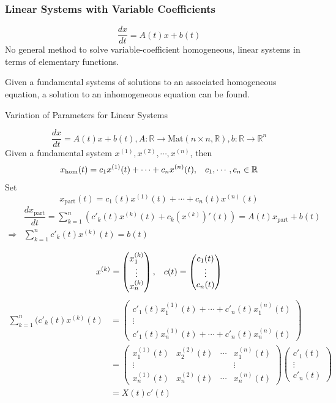 \documentclass{beamer}
\begin{document}
\begin{frame}
\frametitle{Linear Systems with Variable Coefficients}
$$\dfrac{dx}{dt}=A(t)x+b(t)$$
No general method to solve variable-coefficient homogeneous, linear systems in terms of elementary functions.
\begin{block}{}
Given a fundamental systems of solutions to an associated homogeneous equation, a solution to an inhomogeneous equation can be found.
\end{block}
\end{frame}

\begin{frame}
\begin{block}{Variation of Parameters for Linear Systems}

\end{block}
$$\dfrac{dx}{dt}=A(t)x+b(t),A:\mathbb{R}\rightarrow\text{Mat}(n\times n,\mathbb{R}),b:\mathbb{R}\rightarrow\mathbb{R}^n$$
Given a fundamental system $x^{(1)},x^{(2)},\cdots,x^{(n)}$, then
$$x_{\text{hom}}(t)=c_1x^{(1)}(t)+\cdots+c_nx^{(n)}(t),\hspace{3mm}c_1,\cdots,c_n\in\mathbb{R}$$
Set
$$x_{\text{part}}(t)=c_1(t)x^{(1)}(t)+\cdots+c_n(t)x^{(n)}(t)$$
\begin{align*}
&\dfrac{dx_{\text{part}}}{dt}=\sum\limits_{k=1}^n(c'_k(t)x^{(k)}(t)+c_k(x^{(k)})'(t))=A(t)x_{\text{part}}+b(t)\\
\Rightarrow &\sum\limits_{k=1}^nc'_k(t)x^{(k)}(t)=b(t)
\end{align*}
\end{frame}

\begin{frame}
$$x^{(k)}=\begin{pmatrix}
x_1^{(k)}\\
\vdots\\
x_n^{(k)}
\end{pmatrix},\hspace{3mm}c(t)=\begin{pmatrix}
c_1(t)\\
\vdots\\
c_n(t)
\end{pmatrix} $$
\begin{align*}
\sum\limits_{k=1}^n(c'_k(t)x^{(k)}(t)&=\begin{pmatrix}
c'_1(t)x_1^{(1)}(t)+\cdots+c'_n(t)x_1^{(n)}(t)\\
\vdots\\
c'_1(t)x_n^{(1)}(t)+\cdots+c'_n(t)x_n^{(n)}(t)
\end{pmatrix}\\
&=\begin{pmatrix}
x_1^{(1)}(t)&x_2^{(2)}(t)&\cdots&x_1^{(n)}(t)\\
\vdots&&&\vdots\\
x_n^{(1)}(t)&x_n^{(2)}(t)&\cdots&x_n^{(n)}(t)
\end{pmatrix}
\begin{pmatrix}
c'_1(t)\\
\vdots\\
c'_n(t)
\end{pmatrix}\\
&=X(t)c'(t)
\end{align*}
\end{frame}
\end{document}
